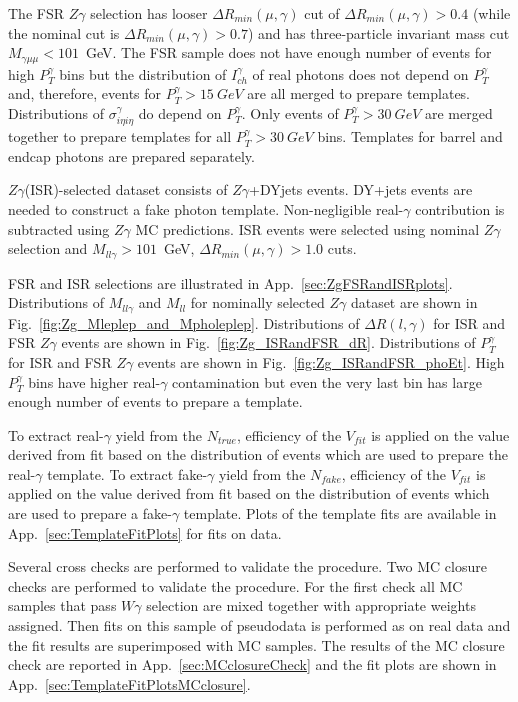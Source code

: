 The FSR $Z\gamma$ selection has looser $\Delta R_{min}(\mu,\gamma)$ cut of $\Delta R_{min}(\mu,\gamma)>0.4$ (while the nominal cut is $\Delta R_{min}(\mu,\gamma)>0.7$) and has three-particle invariant mass cut $M_{\gamma\mu\mu}<101$~GeV. The FSR sample does not have enough number of events for high $P_{T}^{\gamma}$ bins but the distribution of $I_{ch}^{\gamma}$ of real photons does not depend on $P_{T}^{\gamma}$ and, therefore, events for $P_{T}^{\gamma}>15~GeV$ are all merged to prepare templates. Distributions of $\sigma_{i\eta i\eta}^{\gamma}$ do depend on $P_T^{\gamma}$. Only events of $P_T^{\gamma}>30~GeV$ are merged together to prepare templates for all $P_T^{\gamma}>30~GeV$ bins. Templates for barrel and endcap photons are prepared separately.

$Z\gamma$(ISR)-selected dataset consists of $Z\gamma$+DYjets events. DY+jets events are needed to construct a fake photon template. Non-negligible real-$\gamma$ contribution is subtracted using $Z\gamma$ MC predictions. ISR events were selected using nominal $Z\gamma$ selection and $M_{ll\gamma}>101$~GeV, $\Delta{R_{min}}(\mu,\gamma)>1.0$ cuts. 

FSR and ISR selections are illustrated in App.~\ref{sec:ZgFSRandISRplots}. Distributions of $M_{ll\gamma}$ and $M_{ll}$ for nominally selected $Z\gamma$ dataset are shown in Fig.~\ref{fig:Zg_Mleplep_and_Mpholeplep}. Distributions of $\Delta{R}(l,\gamma)$ for ISR and FSR $Z\gamma$ events are shown in Fig.~\ref{fig:Zg_ISRandFSR_dR}. Distributions of $P_{T}^{\gamma}$ for ISR and FSR $Z\gamma$ events are shown in Fig.~\ref{fig:Zg_ISRandFSR_phoEt}. High $P_{T}^{\gamma}$ bins have higher real-$\gamma$ contamination but even the very last bin has large enough number of events to prepare a template. 

To extract real-$\gamma$ yield from the $N_{true}$, efficiency of the $V_{fit}$ is applied on the value derived from fit based on the distribution of events which are used to prepare the real-$\gamma$ template. To extract fake-$\gamma$ yield from the $N_{fake}$, efficiency of the $V_{fit}$ is applied on the value derived from fit based on the distribution of events which are used to prepare a fake-$\gamma$ template. Plots of the template fits are available in App.~\ref{sec:TemplateFitPlots} for fits on data. 

Several cross checks are performed to validate the procedure. Two MC closure checks are performed to validate the procedure. For the first check all MC samples that pass $W\gamma$ selection are mixed together with appropriate weights assigned. Then fits on this sample of pseudodata is performed as on real data and the fit results are superimposed with MC samples. The results of the MC closure check are reported in App.~\ref{sec:MCclosureCheck} and the fit plots are shown in App.~\ref{sec:TemplateFitPlotsMCclosure}. 

